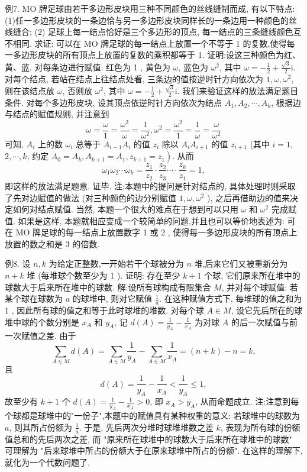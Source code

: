 例7. $\mathrm{MO}$ 牌足球由若干多边形皮块用三种不同颜色的丝线缝制而成,
有以下特点:
(1)任一多边形皮块的一条边恰与另一多边形皮块同样长的一条边用一种颜色的丝线缝合;
(2) 足球上每一结点恰好是三个多边形的顶点, 每一结点的三条缝线颜色互不相同.
求证: 可以在 $\mathrm{MO}$ 牌足球的每一结点上放置一个不等于 1 的复数,使得每一多边形皮块的所有顶点上放置的复数的乘积都等于 1. 
证明:设这三种颜色为红、黄、蓝.
对每条边进行赋值: 红色为 1 , 黄色为 $\omega$, 蓝色为 $\omega^2$, 其中 $\omega=-\frac{1}{2}+\frac{\sqrt{3}}{2} \mathrm{i}$.
对每个结点, 若站在结点上往结点处看, 三条边的值按逆时针方向依次为 $1, \omega, \omega^2$, 则在该结点放 $\omega$, 否则放 $\omega^2$, 其中 $\omega=-\frac{1}{2}+\frac{\sqrt{3}}{2} \mathrm{i}$. 我们来验证这样的放法满足题目条件.
对每个多边形皮块, 设其顶点依逆时针方向依次为结点 $A_1, A_2, \cdots, A_k$, 根据边与结点的赋值规则, 并注意到
$$
\omega=\frac{\omega}{1}=\frac{\omega^2}{\omega}=\frac{1}{\omega^2}, \omega^2=\frac{\omega^2}{1}=\frac{1}{\omega}=\frac{\omega}{\omega^2}
$$
可知, $A_i$ 上的数 $\omega_i$ 总等于 $A_{i-1} A_i$ 的值 $z_i$ 除以 $A_i A_{i+1}$ 的值 $z_{i+1}$ (其中 $i=1$, $2, \cdots, k$, 约定 $\left.A_0=A_k, A_{k+1}=A_1, z_{k+1}=z_1\right)$. 从而
$$
\omega_1 \omega_2 \cdots \omega_k=\frac{z_1}{z_2} \cdot \frac{z_2}{z_3} \cdots \cdot \frac{z_k}{z_1}=1,
$$
即这样的放法满足题意.
证毕.
注:本题中的提问是针对结点的, 具体处理时则采取了先对边赋值的做法 (对三种颜色的边分别赋值 $1, \omega, \omega^2$ ), 之后再借助边的值来决定如何对结点赋值.
当然, 本题一个很大的难点在于想到可以只用 $\omega$ 和 $\omega^2$ 完成赋值.
如果是这样, 本题就相应变成一个较简单的问题,并且也可以等价地表述为: 可在 $\mathrm{MO}$ 牌足球的每一结点上放置数字 1 或 2 , 使得每一多边形皮块的所有顶点上放置的数之和是 3 的倍数.



例8. 设 $n, k$ 为给定正整数,一开始若干个球被分为 $n$ 堆,后来它们又被重新分为 $n+k$ 堆 (每堆球个数至少为 1 ). 证明: 存在至少 $k+1$ 个球, 它们原来所在堆中的球数大于后来所在堆中的球数.
解:设所有球构成有限集合 $M$, 并对每个球赋值: 若某个球在球数为 $a$
的球堆中, 则对它赋值 $\frac{1}{a}$. 在这种赋值方式下, 每堆球的值之和为 1 , 因此所有球的值之和等于此时球堆的堆数.
对每个球 $A \in M$, 设它先后所在的球堆中球的个数分别是 $x_A$ 和 $y_A$, 记 $d(A)=\frac{1}{y_A}-\frac{1}{x_A}$ 为对球 $A$ 的后一次赋值与前一次赋值之差.
由于
$$
\sum_{A \in M} d(A)=\sum_{A \in M} \frac{1}{y_A}-\sum_{A \in M} \frac{1}{x_A}=(n+k)-n=k,
$$
且
$$
d(A)=\frac{1}{y_A}-\frac{1}{x_A}<\frac{1}{y_A} \leqslant 1,
$$
故至少有 $k+1$ 个 $d(A)=\frac{1}{y_A}-\frac{1}{x_A}>0$, 即 $x_A>y_A$, 从而命题成立.
注:注意到每个球都是球堆中的"一份子",本题中的赋值具有某种权重的意义: 若球堆中的球数为 $a$, 则其所占份额为 $\frac{1}{a}$. 于是, 先后两次分堆时球堆堆数之差 $k$, 表现为所有球的份额值总和的先后两次之差, 而 "原来所在球堆中的球数大于后来所在球堆中的球数" 可理解为 "后来球堆中所占的份额大于在原来球堆中所占的份额". 在这样的理解下, 就化为一个代数问题了.


